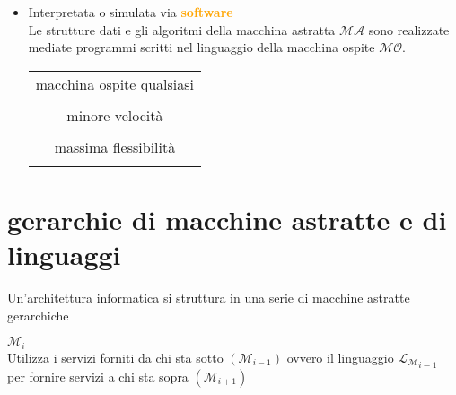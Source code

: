 \documentclass[a4paper,11pt,hidelinks]{book}
\theoremstyle{definition}
\begin{document}
    \begin{itemize}
        \item Interpretata o simulata via \textcolor{orange}{\textbf{software}} \label{simulata via SW} \\
        Le strutture dati e gli algoritmi della macchina astratta $\mathcal{MA}$ sono realizzate mediate programmi scritti nel linguaggio della macchina ospite $\mathcal{MO}$.
        
        \vspace{0.5cm}
        
        \centering
        \begin{tabular}{|c|}
        \hline
        macchina ospite qualsiasi \\ \\ \hline
        minore velocità \\ \\ \hline
        massima flessibilità \\ \\
        \hline
        \end{tabular}
        
    \end{itemize}

\section{gerarchie di macchine astratte e di linguaggi}
    Un'architettura informatica si struttura in una serie di macchine astratte gerarchiche

    \begin{multicols}{2}

    
    
        $\mathcal{M}_i$ \\
        Utilizza i servizi forniti da chi sta sotto $( \mathcal{M}_{i-1} )$ ovvero il linguaggio $\mathcal{L_M}_{i-1}$ \\
        per fornire servizi a chi sta sopra $( \mathcal{M}_{i+1} )$

    \end{multicols}
    
\end{document}
